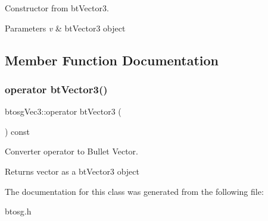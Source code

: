 Constructor from bt\+Vector3. 


\begin{DoxyParams}{Parameters}
{\em v} & bt\+Vector3 object \\
\hline
\end{DoxyParams}


\subsection{Member Function Documentation}
\mbox{\label{classbtosgVec3_a8e9e5bea1a46ba76e213a3f6e5e14dba}} 
\subsubsection{\texorpdfstring{operator btVector3()}{operator btVector3()}}
{\footnotesize\ttfamily btosg\+Vec3\+::operator bt\+Vector3 (\begin{DoxyParamCaption}{ }\end{DoxyParamCaption}) const\hspace{0.3cm}{\ttfamily [inline]}}



Converter operator to Bullet Vector. 

Returns vector as a bt\+Vector3 object 

The documentation for this class was generated from the following file\+:\begin{DoxyCompactItemize}
\item 
btosg.\+h\end{DoxyCompactItemize}
